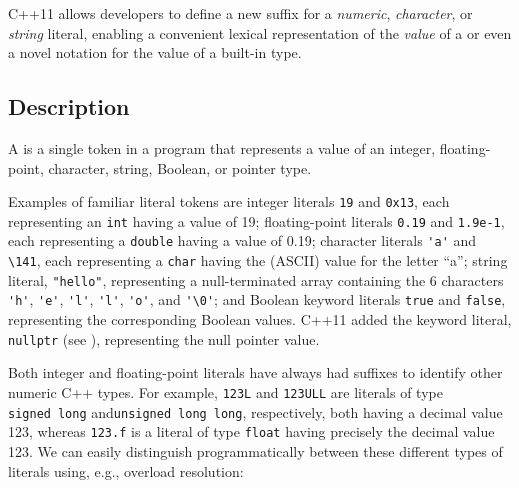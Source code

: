 
\setcounter{table}{0}
\setcounter{footnote}{0}
\setcounter{lstlisting}{0}


C++11 allows developers to define a new suffix for a \emph{numeric},
\emph{character}, or \emph{string} literal, enabling a convenient
lexical representation of the \emph{value} of a  or even a novel notation for the value of a built-in type.

\subsection[Description]{Description}\label{description-userdeflit}

A  is a single token in a program that represents a
value of an integer, floating-point, character, string, Boolean, or
pointer type.

Examples of familiar literal tokens are integer literals \lstinline!19! and
\lstinline!0x13!, each representing an \lstinline!int! having a value of 19;
floating-point literals \lstinline!0.19! and \lstinline!1.9e-1!, each
representing a \lstinline!double! having a value of 0.19; character
literals \lstinline!'a'! and \lstinline!\141!, 
each representing a
\lstinline!char! having the (ASCII) value for the letter ``a''; string
literal, \lstinline!"hello"!, representing a null-terminated array
containing the 6 characters \lstinline!'h'!, \lstinline!'e'!, \lstinline!'l'!,
\lstinline!'l'!, \lstinline!'o'!, and \lstinline!'\0'!; 
and Boolean
keyword literals \lstinline!true! and \lstinline!false!, representing the
corresponding Boolean values. C++11 added the keyword literal,
\lstinline!nullptr! (see ), representing the
null pointer value.

Both integer and floating-point literals have always had suffixes to
identify other numeric C++ types. For example, \lstinline!123L! and
\lstinline!123ULL! are literals of type \lstinline!signed!~\lstinline!long! and\linebreak[4]%
\lstinline!unsigned!~\lstinline!long!~\lstinline!long!, respectively, both having
a decimal value 123, whereas \lstinline!123.f! is a literal of type
\lstinline!float! having precisely the decimal value 123. We can easily
distinguish programmatically between these different types of literals
using, e.g., overload resolution:

